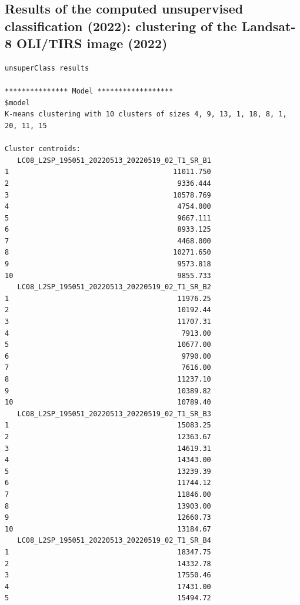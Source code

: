 \documentclass[knowledge,article,submit,pdftex,moreauthors]{Definitions/mdpi}
\begin{document}
\subsection[\appendixname~\thesubsection]{Results of the computed unsupervised classification (2022): clustering of the Landsat-8 OLI/TIRS image (2022)}
\begin{small}
\begin{verbatim}
unsuperClass results

*************** Model ******************
$model
K-means clustering with 10 clusters of sizes 4, 9, 13, 1, 18, 8, 1, 20, 11, 15

Cluster centroids:
   LC08_L2SP_195051_20220513_20220519_02_T1_SR_B1
1                                       11011.750
2                                        9336.444
3                                       10578.769
4                                        4754.000
5                                        9667.111
6                                        8933.125
7                                        4468.000
8                                       10271.650
9                                        9573.818
10                                       9855.733
   LC08_L2SP_195051_20220513_20220519_02_T1_SR_B2
1                                        11976.25
2                                        10192.44
3                                        11707.31
4                                         7913.00
5                                        10677.00
6                                         9790.00
7                                         7616.00
8                                        11237.10
9                                        10389.82
10                                       10789.40
   LC08_L2SP_195051_20220513_20220519_02_T1_SR_B3
1                                        15083.25
2                                        12363.67
3                                        14619.31
4                                        14343.00
5                                        13239.39
6                                        11744.12
7                                        11846.00
8                                        13903.00
9                                        12660.73
10                                       13184.67
   LC08_L2SP_195051_20220513_20220519_02_T1_SR_B4
1                                        18347.75
2                                        14332.78
3                                        17550.46
4                                        17431.00
5                                        15494.72

\end{verbatim}
\end{small}
\end{document}
